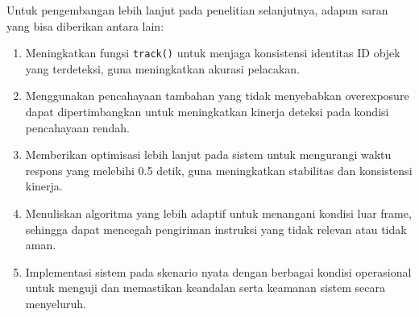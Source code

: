 Untuk pengembangan lebih lanjut pada penelitian selanjutnya, adapun saran yang bisa diberikan antara lain:

\begin{enumerate}[nolistsep]
  \item Meningkatkan fungsi \texttt{track()} untuk menjaga konsistensi identitas ID objek yang terdeteksi, guna meningkatkan akurasi pelacakan.
  \item Menggunakan pencahayaan tambahan yang tidak menyebabkan overexposure dapat dipertimbangkan untuk meningkatkan kinerja deteksi pada kondisi pencahayaan rendah.
  \item Memberikan optimisasi lebih lanjut pada sistem untuk mengurangi waktu respons yang melebihi 0.5 detik, guna meningkatkan stabilitas dan konsistensi kinerja.
  \item Menuliskan algoritma yang lebih adaptif untuk menangani kondisi luar frame, sehingga dapat mencegah pengiriman instruksi yang tidak relevan atau tidak aman.
  \item Implementasi sistem pada skenario nyata dengan berbagai kondisi operasional untuk menguji dan memastikan keandalan serta keamanan sistem secara menyeluruh.
\end{enumerate}
